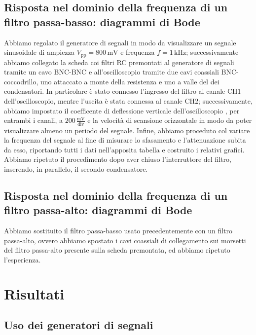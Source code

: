 \documentclass{article}
\begin{document}
		\subsection{Risposta nel dominio della frequenza di un filtro passa-basso: diagrammi di Bode}
			Abbiamo regolato il generatore di segnali in modo da visualizzare un segnale sinusoidale di ampiezza $ V_{\mathrm{pp}} = 800 \, \mathrm{mV} $ e frequenza $ f = 1 \, \mathrm{kHz} $; successivamente abbiamo collegato la scheda coi filtri RC premontati al generatore di segnali tramite un cavo BNC-BNC e all'oscilloscopio tramite due cavi coassiali BNC-coccodrillo, uno attaccato a monte della resistenza e uno a valle del dei condensatori.
			\newline
			In particolare è stato connesso l'ingresso del filtro al canale $ \mathrm{CH1} $ dell'oscilloscopio, mentre l'uscita è stata connessa al canale $ \mathrm{CH2} $; successivamente, abbiamo impostato il coefficente di deflessione verticale dell'oscilloscopio , per entrambi i canali, a $ 200 \, \mathrm{\frac{mV}{div}} $ e la velocità di scansione orizzontale in modo da poter visualizzare almeno un periodo del segnale.
			\newline
			Infine, abbiamo proceduto col variare la frequenza del segnale al fine di misurare lo sfasamento e l'attenuazione subita da esso, riportando tutti i dati nell'apposita tabella e costruito i relativi grafici.
			Abbiamo ripetuto il procedimento dopo aver chiuso l'interruttore del filtro, inserendo, in parallelo, il secondo condensatore.
		\subsection{Risposta nel dominio della frequenza di un filtro passa-alto: diagrammi di Bode}
			Abbiamo sostituito il filtro passa-basso usato precedentemente con un filtro passa-alto, ovvero abbiamo spostato i cavi coassiali di collegamento sui morsetti del filtro passa-alto presente sulla scheda premontata, ed abbiamo ripetuto l'esperienza.
	\section{Risultati}
		\subsection{Uso dei generatori di segnali}
\end{document}
